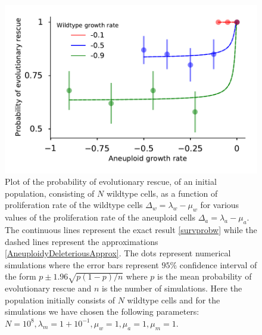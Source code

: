 \documentclass[12pt]{extarticle}
\begin{document}
\begin{figure}[!h]
 \vspace*{1\baselineskip}
\includegraphics[width=1\textwidth]{Figures/P_est_divergenceLargePopulation.pdf}
\caption{Plot of the probability of evolutionary rescue, of an initial population, consisting of $N$ wildtype cells, as a function of proliferation rate of the wildtype cells $\Delta_w=\lambda_w-\mu_w$ for various values of the proliferation rate of the aneuploid cells $\Delta_a=\lambda_a-\mu_a$. The continuous lines represent the exact result \eqref{survprobw} while the dashed lines represent the approximations \eqref{AneuploidyDeleteriousApprox}. The dots represent numerical simulations where the error bars represent $95\%$ confidence interval of the form $p\pm1.96\sqrt{p\left(1-p\right)/n}$ where $p$ is the mean probability of evolutionary rescue and $n$ is the number of simulations.  Here the population initially consists of $N$ wildtype cells and for the simulations we have chosen the following parameters: $N=10^8,\lambda_m=1+10^{-1},\mu_w=1,\mu_a=1,\mu_m=1$. }
\label{P_est_large_N}
\end{figure}
\end{document}
